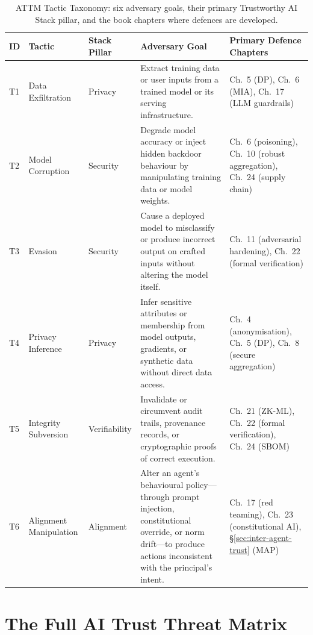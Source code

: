 \begin{table}[h]
\caption{ATTM Tactic Taxonomy: six adversary goals, their primary
         Trustworthy AI Stack pillar, and the book chapters where
         defences are developed.}
\label{tab:attm-tactic-taxonomy}
\begin{tabular}{p{0.4cm} p{2.6cm} p{2.0cm} p{2.8cm} p{4.0cm}}
\toprule
\textbf{ID}
  & \textbf{Tactic}
  & \textbf{Stack Pillar}
  & \textbf{Adversary Goal}
  & \textbf{Primary Defence Chapters} \\
\midrule
T1 & Data Exfiltration
   & Privacy
   & Extract training data or user inputs from a trained model or
     its serving infrastructure.
   & Ch.~5 (DP), Ch.~6 (MIA), Ch.~17 (LLM guardrails) \\
\addlinespace
T2 & Model Corruption
   & Security
   & Degrade model accuracy or inject hidden backdoor behaviour
     by manipulating training data or model weights.
   & Ch.~6 (poisoning), Ch.~10 (robust aggregation),
     Ch.~24 (supply chain) \\
\addlinespace
T3 & Evasion
   & Security
   & Cause a deployed model to misclassify or produce incorrect
     output on crafted inputs without altering the model itself.
   & Ch.~11 (adversarial hardening),
     Ch.~22 (formal verification) \\
\addlinespace
T4 & Privacy Inference
   & Privacy
   & Infer sensitive attributes or membership from model outputs,
     gradients, or synthetic data without direct data access.
   & Ch.~4 (anonymisation), Ch.~5 (DP),
     Ch.~8 (secure aggregation) \\
\addlinespace
T5 & Integrity Subversion
   & Verifiability
   & Invalidate or circumvent audit trails, provenance records,
     or cryptographic proofs of correct execution.
   & Ch.~21 (ZK-ML), Ch.~22 (formal verification),
     Ch.~24 (SBOM) \\
\addlinespace
T6 & Alignment Manipulation
   & Alignment
   & Alter an agent's behavioural policy---through prompt
     injection, constitutional override, or norm drift---to
     produce actions inconsistent with the principal's intent.
   & Ch.~17 (red teaming), Ch.~23 (constitutional AI),
     §\ref{sec:inter-agent-trust} (MAP) \\
\bottomrule
\end{tabular}
\end{table}

\section{The Full AI Trust Threat Matrix}
\label{sec:attm-matrix}

